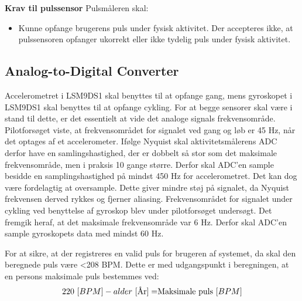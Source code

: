\textbf{Krav til pulssensor} \newline
Pulsmåleren skal:
\begin{itemize}
\item Kunne opfange brugerens puls under fysisk aktivitet. Der accepteres ikke, at pulssensoren opfanger ukorrekt eller ikke tydelig puls under fysisk aktivitet.
\end{itemize}

\subsection{Analog-to-Digital Converter} \label{krav_adc}
Accelerometret i LSM9DS1 skal benyttes til at opfange gang, mens gyroskopet i LSM9DS1 skal benyttes til at opfange cykling. For at begge sensorer skal være i stand til dette, er det essentielt at vide det analoge signals frekvensområde. %
Pilotforsøget viste, at frekvensområdet for signalet ved gang og løb er 45 Hz, når det optages af et accelerometer. Ifølge Nyquist skal aktivitetsmålerens ADC derfor have en samlingshastighed, der er dobbelt så stor som det maksimale frekvensområde, men i praksis 10 gange større. Derfor skal ADC'en sample besidde en samplingshastighed på mindst 450 Hz for accelerometret. Det kan dog være fordelagtig at oversample. Dette giver mindre støj på signalet, da Nyquist frekvensen derved rykkes og fjerner aliasing. \newline
Frekvensområdet for signalet under cykling ved benyttelse af gyroskop blev under pilotforsøget undersøgt. Det fremgik heraf, at det maksimale frekvensområde var 6 Hz. Derfor skal ADC'en sample gyroskopets data med mindst 60 Hz.

For at sikre, at der registreres en valid puls for brugeren af systemet, da skal den beregnede puls være <208 BPM. Dette er med udgangspunkt i beregningen, at en persons maksimale puls bestemmes ved: \citep{CooperBlair2005} 
\begin{equation}
220~[BPM] - alder~[$År$] = $Maksimale puls$~[BPM]
\end{equation}

